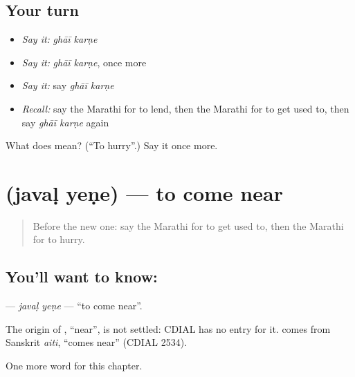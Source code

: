 \subsection*{Your turn}
\begin{itemize}
\raggedright
  \item \emph{Say it:} \emph{ghāī karṇe}
  \item \emph{Say it:} \emph{ghāī karṇe}, once more
  \item \emph{Say it:} say \emph{ghāī karṇe}
  \item \emph{Recall:} say the Marathi for to lend, then the Marathi for to get used to, then say \emph{ghāī karṇe} again
\end{itemize}

\begin{tcolorbox}[breakable,colback=teal!4,colframe=teal!35!black,title={Before you move on}]
What does   mean? (\textquotedblleft{}To hurry\textquotedblright{}.) Say it once more.
\end{tcolorbox}
\section[\texorpdfstring{\mr{जवळ} \mr{येणे} (javaḷ yeṇe)}{जवळ येणे (javaḷ yeṇe)}]{  (javaḷ yeṇe) — to come near}

\label{lesson:MR-C197-javal-yene}



\begin{quote}
Before the new one: say the Marathi for to get used to, then the Marathi for to hurry.
\end{quote}

\subsection*{You'll want to know:  }
\textbf{ } — \emph{javaḷ yeṇe} — \textquotedblleft{}to come near\textquotedblright{}.

\begin{cousinweb}
The origin of \textbf{}, \textquotedblleft{}near\textquotedblright{}, is not settled: CDIAL has no entry for it. \textbf{} comes from Sanskrit \emph{aiti}, \textquotedblleft{}comes near\textquotedblright{} (CDIAL 2534).
\end{cousinweb}

\begin{grammarlens}[title={What you've built}]
One more word for this chapter.
\end{grammarlens}

